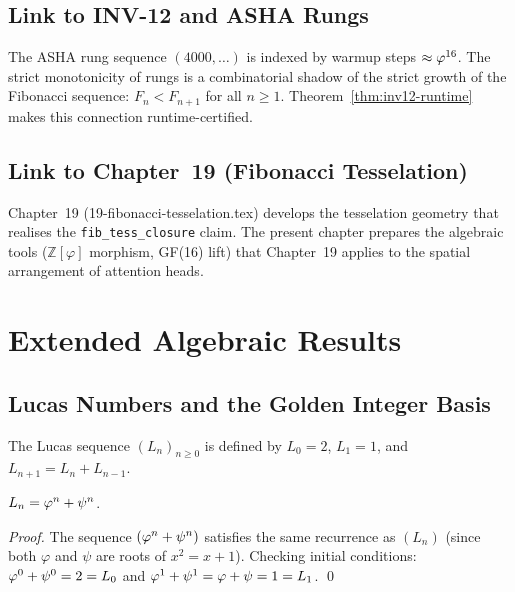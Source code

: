 \subsection{Link to INV-12 and ASHA Rungs}\label{subsec:ch7-inv12-link}

The ASHA rung sequence \((4000, \ldots)\) is indexed by warmup steps
\(\approx \varphi^{16}\).  The strict monotonicity of rungs is a
combinatorial shadow of the strict growth of the Fibonacci sequence:
\(F_n < F_{n+1}\) for all \(n \geq 1\).
Theorem~\ref{thm:inv12-runtime} makes this connection runtime-certified.

\subsection{Link to Chapter~19 (Fibonacci Tesselation)}\label{subsec:ch7-ch19}

Chapter~19 (19-fibonacci-tesselation.tex) develops the tesselation geometry
that realises the \texttt{fib\_tess\_closure} claim.  The present chapter
prepares the algebraic tools (\(\mathbb{Z}[\varphi]\) morphism, GF(16) lift)
that Chapter~19 applies to the spatial arrangement of attention heads.

\section{Extended Algebraic Results}\label{sec:ch7-extended}

\subsection{Lucas Numbers and the Golden Integer Basis}\label{subsec:ch7-lucas}

\begin{definition}\label{def:lucas}
The Lucas sequence \((L_n)_{n\geq 0}\) is defined by
\(L_0 = 2\), \(L_1 = 1\), and \(L_{n+1} = L_n + L_{n-1}\).
\end{definition}

\begin{proposition}\label{prop:lucas-binet}
\(L_n = \varphi^{n} + \psi^n\).
\end{proposition}

\begin{proof}
The sequence \((\varphi^{n}+\psi^n)\) satisfies the same recurrence as
\((L_n)\) (since both \(\varphi\) and \(\psi\) are roots of \(x^2=x+1\)).
Checking initial conditions: \(\varphi^{0}+\psi^0 = 2 = L_0\) and
\(\varphi^{1}+\psi^1 = \varphi+\psi = 1 = L_1\). \qed
\end{proof}

